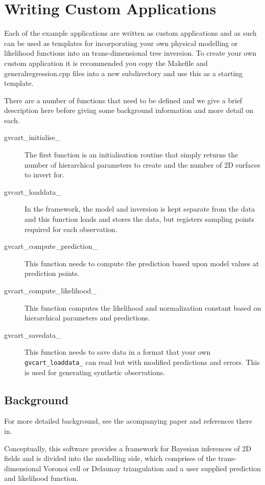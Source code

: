 \documentclass[a4paper,12pt]{article}
\begin{document}
\section{Writing Custom Applications}

Each of the example applications are written as custom applications
and as such can be used as templates for incorporating your own
physical modelling or likelihood functions into an trans-dimensional
tree inversion. To create your own custom application it is recommended you
copy the Makefile and generalregression.cpp files into a new subdirectory
and use this as a starting template.

There are a number of functions that need to be defined and we give
a brief description here before giving some background information and more
detail on each.

\begin{description}
  \item[gvcart\_initialise\_]  The first function is an initialisation routine that simply returns the
number of hierarchical parameters to create and the number of 2D surfaces
to invert for.
\item[gvcart\_loaddata\_] In the framework, the model and inversion is kept separate from the
  data and this function loads and stores the data, but registers sampling points required for
  each observation.
\item[gvcart\_compute\_prediction\_] This function needs to compute the prediction based
  upon model values at prediction points.
\item[gvcart\_compute\_likelihood\_] This function computes the likelihood and normalization
  constant based on hierarchical parameters and predictions.
\item[gvcart\_savedata\_] This function needs to save data in a format that your own \texttt{gvcart\_loaddata\_} can read but with modified predictions and errors. This is used for generating synthetic
  observations.
\end{description}

\subsection{Background}

For more detailed background, see the acompanying paper
\citet{Hawkins:2018:B} and references there in.

Conceptually, this software provides a framework for Bayesian inferences of
2D fields and is divided into the modelling side, which
comprises of the trans-dimensional Voronoi cell or Delaunay
triangulation and a user supplied prediction and likelihood function.
\end{document}

